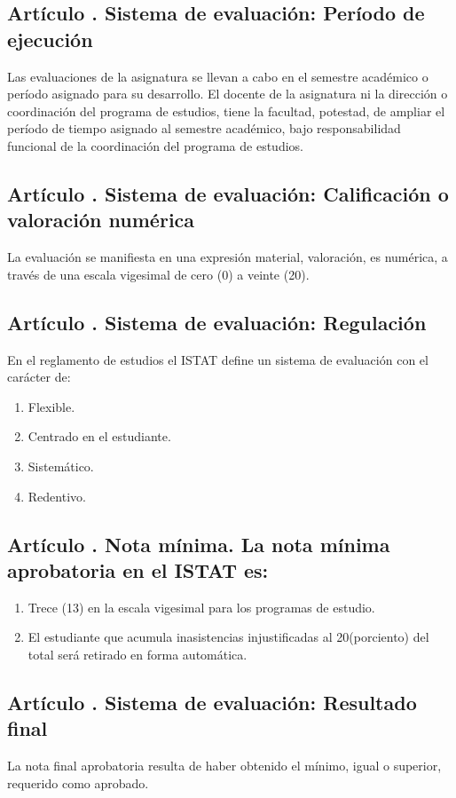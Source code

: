 \subsection{Artículo . Sistema de evaluación: Período de ejecución}
\addtocounter{ns}{1}
Las evaluaciones de la asignatura se llevan a cabo en el semestre académico o período asignado para su desarrollo. El docente de la asignatura ni la dirección o coordinación del programa de estudios, tiene la facultad, potestad, de ampliar el período de tiempo asignado al semestre académico, bajo responsabilidad funcional de la coordinación del programa de estudios. 
\subsection{Artículo . Sistema de evaluación: Calificación o valoración numérica}
\addtocounter{ns}{1}
La evaluación se manifiesta en una expresión material, valoración, es numérica, a través de una escala vigesimal de cero (0) a veinte (20).   
\subsection{Artículo . Sistema de evaluación: Regulación}
\addtocounter{ns}{1}
En el reglamento de estudios el ISTAT define un sistema de evaluación con el carácter de: 
\begin{enumerate}
\item Flexible. 
\item Centrado en el estudiante. 
\item Sistemático. 
\item Redentivo. 
\end{enumerate}
\subsection{Artículo . Nota mínima. La nota mínima aprobatoria en el ISTAT es:}
\addtocounter{ns}{1}
\begin{enumerate}
\item Trece (13) en la escala vigesimal para los programas de estudio.  
\item El estudiante que acumula inasistencias injustificadas al 20(porciento) del total será retirado en forma automática.
\end{enumerate}
\subsection{Artículo . Sistema de evaluación: Resultado final}
\addtocounter{ns}{1}
La nota final aprobatoria resulta de haber obtenido el mínimo, igual o superior, requerido como aprobado.  


